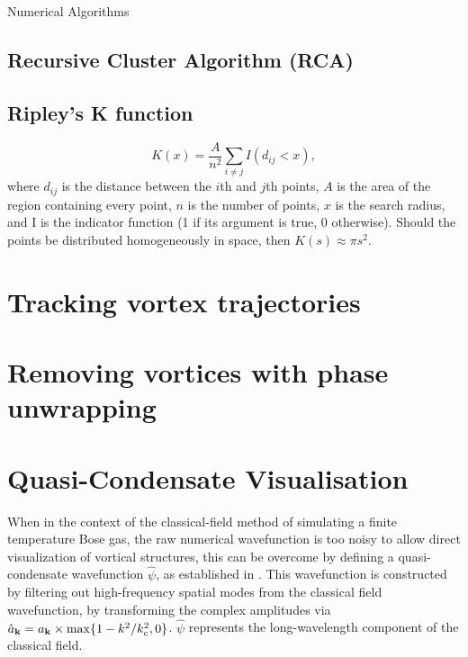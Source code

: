 \begin{chapter}{\label{cha:numerics}Numerical Algorithms}
	\subsection{\label{section:reevesalgorithm} Recursive Cluster Algorithm (RCA) }
		


	\subsection{\label{section:ripleysk} Ripley's K function }
		\begin{equation}\label{eq:ripleysk}
		K(x) = \frac{A}{n^2}\sum\limits_{i \ne j} I\left (d_{ij}<x\right ),
		\end{equation}
		where $d_{ij}$ is the distance between the $i$th and $j$th points, $A$ is the area of the region containing every point, $n$ is the number of points, $x$ is the search radius, and I is the indicator function (1 if its argument is true, 0 otherwise). Should the points be distributed homogeneously in space, then $K(s)\approx\pi s^2$.
\section{\label{section:vortextracking} Tracking vortex trajectories}
\section{\label{section:vortexremoval} Removing vortices with phase unwrapping}

\section{\label{section:quasi-condensate} Quasi-Condensate Visualisation}
When in the context of the classical-field method of simulating a finite temperature Bose gas, the raw numerical wavefunction is too noisy to allow direct visualization of vortical structures, this can be overcome by defining a quasi-condensate wavefunction $\hat{\psi}$, as established in \cite{PhysRevA.66.013603}.   This wavefunction is constructed by filtering out high-frequency spatial modes from the classical field wavefunction, by 
transforming the complex amplitudes via
$\hat{a}_{{\bf k}} = a_{{\bf k}}\times\max\{1-k^{2}/k_c^2,0\}$. $\hat{\psi}$ represents the long-wavelength component of the classical field.


\end{chapter}
